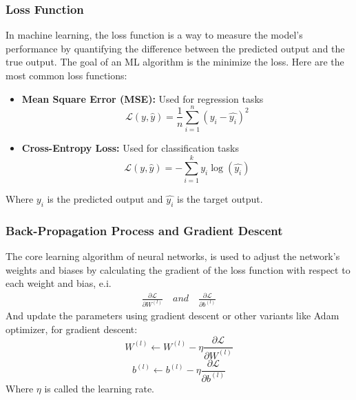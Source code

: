 \documentclass[12pt,a4paper]{report}
\begin{document}
\subsubsection{Loss Function}
In machine learning, the loss function is a way to measure the model's performance by quantifying the difference between the predicted output and the true output. The goal of an ML algorithm is the minimize the loss. Here are the most common loss functions:
\begin{itemize}
    \item \textbf{Mean Square Error (MSE):} Used for regression tasks $$\mathcal{L}(y,\hat{y})=\frac{1}{n}\sum_{i=1}^{n}(y_i-\hat{y_i})^2$$
    \item \textbf{Cross-Entropy Loss:} Used for classification tasks $$\mathcal{L}(y,\hat{y})=-\sum_{i=1}^{k}y_i\log{(\hat{y_i})}$$ 
\end{itemize}
Where $y_i$ is the predicted output and $\hat{y_i}$ is the target output.
\subsubsection{Back-Propagation Process and Gradient Descent}
The core learning algorithm of neural networks, is used to adjust the network's weights and biases by calculating the gradient of the loss function with respect to each weight and bias, e.i. $$\begin{aligned}\frac{\partial\mathcal{L}}{\partial W^{(l)}}\quad and \quad\frac{\partial\mathcal{L}}{\partial b^{(l)}}\end{aligned}$$
And update the parameters using gradient descent or other variants like  Adam optimizer, for gradient descent: $$W^{(l)}\leftarrow W^{(l)}-\eta\frac{\partial\mathcal{L}}{\partial W^{(l)}}$$ $$b^{(l)}\leftarrow b^{(l)}-\eta\frac{\partial\mathcal{L}}{\partial b^{(l)}}$$
Where $\eta$ is called the learning rate.
\end{document}
